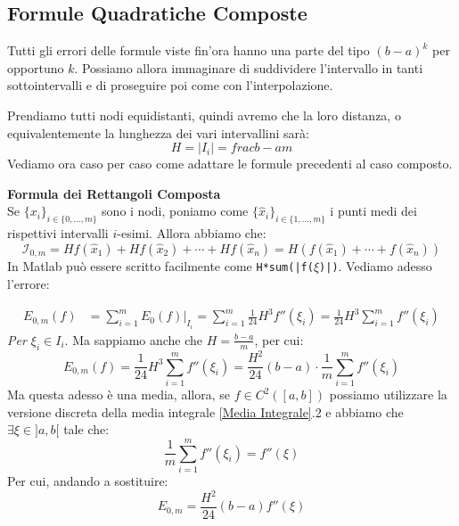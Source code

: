 \documentclass[11pt,a4paper,twoside]{article}
\theoremstyle{definition}
\begin{document}
\subsection{Formule Quadratiche Composte}

Tutti gli errori delle formule viste fin'ora hanno una parte del tipo $(b-a)^k$ per opportuno $k$. Possiamo allora immaginare di suddividere l'intervallo in tanti sottointervalli e di proseguire poi come con l'interpolazione.

\begin{center}
\end{center}
Prendiamo tutti nodi equidistanti, quindi avremo che la loro distanza, o equivalentemente la lunghezza dei vari intervallini sarà:
\[ H = |I_i| = frac{b-a}m \]
Vediamo ora caso per caso come adattare le formule precedenti al caso composto.

\textbf{Formula dei Rettangoli Composta}\\
Se $\{x_i\}_{i \in\{0,...,m\}}$ sono i nodi, poniamo come $\{\hat x_i\}_{i \in \{1,...,m\}}$ i punti medi dei rispettivi intervalli $i$-esimi. Allora abbiamo che:
\[ \mathcal I_{0,m} = Hf(\hat x_1) + Hf(\hat x_2) + \cdots + Hf(\hat x_n) = H(f(\hat x_1) + \cdots + f(\hat x_n)) \]
In Matlab può essere scritto facilmente come \texttt{H*sum(|f($\xi$)|)}. Vediamo adesso l'errore:

\begin{align*}
	E_{0,m}(f) &= \sum_{i = 1}^m \left.E_0(f)\right|_{I_i} = \sum_{i = 1}^m \frac 1{24} H^3 f''(\xi_i) = \frac 1{24} H^3 \sum_{i = 1}^m f''(\xi_i)
\end{align*}
\textit{Per $\xi_i \in I_i$}. Ma sappiamo anche che $H =\frac{b-a}m$, per cui:
\[ E_{0,m}(f) = \frac 1{24} H^3 \sum_{i = 1}^m f''(\xi_i) = \frac{H^2}{24} (b-a) \cdot \frac 1m \sum_{i = 1}^m f''(\xi_i) \]
Ma questa adesso è una media, allora, se $f\in C^2([a,b])$ possiamo utilizzare la versione discreta della media integrale \ref{Media Integrale}.2 e abbiamo che $\exists \xi \in ]a,b[$ tale che:
\[ \frac 1m \sum_{i = 1}^m f''(\xi_i) = f''(\xi) \]
Per cui, andando a sostituire:
\[ E_{0,m} = \frac{H^2}{24}(b-a) f''(\xi) \]
\end{document}
